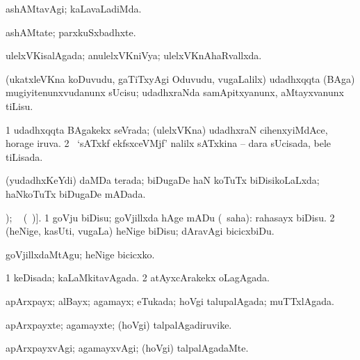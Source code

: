{{\bentry
{} 
\gl{\kirxvi}
\expl{}
\bmng
ashAMtavAgi; kaLavaLadiMda. 
\emng
\eentry

\bentry
{} 
\gl{\nA}
\expl{}
\bmng
ashAMtate; parxkuSxbadhxte. 
\emng
\eentry

\bentry
{} 
\gl{\gu}
\expl{}
\bmng
ulelxVKisalAgada; anulelxVKniVya; ulelxVKnAhaRvallxda. 
\emng
\eentry

\bentry
{} 
\gl{\sakirx}
\expl{}
\bmng
(ukatxleVKna koDuvudu, gaTiTxyAgi Oduvudu, \mo vugaLalilx) udadhxqqta (BAga) mugiyitenunxvudanunx sUcisu; udadhxraNda samApitxyanunx, aMtayxvanunx tiLisu. 
\emng
\eentry

\bentry
{} 
\gl{\gu}
\expl{}
\bmng
\bnum
\num{1} udadhxqqta BAgakekx seVrada; (ulelxVKna) udadhxraN cihenxyiMdAce, horage iruva. 
\num{2} \kanmu\ `sATxkf ekfsxceVMjf' nalilx sATxkina -- dara sUcisada, bele tiLisada. 
\enum
\emng
\eentry

\bentry
{} 
\gl{\gu}
\expl{}
\bmng
(yudadhxKeYdi) daMDa terada; biDugaDe haN koTuTx biDisikoLaLxda; haNkoTuTx biDugaDe mADada. 
\emng
\eentry

\bentry
{} 
\gl{\sakirx}
\expl{[\BU\ matutx \BUkaq\ \eng{unravelled} (\ame\ }
); \vakaq\  (\ame\ )].\bmng
\bnum
\num{1} goVju biDisu; goVjillxda hAge mADu (\rUpa\ saha):  rahasayx biDisu. 
\num{2} (heNige, kasUti, \mo vugaLa) heNige biDisu; dAravAgi bicicxbiDu. 
\enum
\emng

\noindent
\gl{\akirx}
\expl{}
\bmng
goVjillxdaMtAgu; heNige bicicxko. 
\emng
\eentry

\bentry
{} 
\gl{\gu}
\expl{}
\bmng
\bnum
\num{1} keDisada; kaLaMkitavAgada. 
\num{2} atAyxcArakekx oLagAgada. 
\enum
\emng
\eentry

\bentry
{} 
\gl{\gu}
\expl{}
\bmng
apArxpayx; alBayx; agamayx; eTukada; hoVgi talupalAgada; muTTxlAgada. 
\emng
\eentry

\bentry
{} 
\gl{\nA}
\expl{}
\bmng
apArxpayxte; agamayxte; (hoVgi) talpalAgadiruvike. 
\emng
\eentry

\bentry
{} 
\gl{\kirxvi}
\expl{}
\bmng
apArxpayxvAgi; agamayxvAgi; (hoVgi) talpalAgadaMte. 
\emng
\eentry

}}
